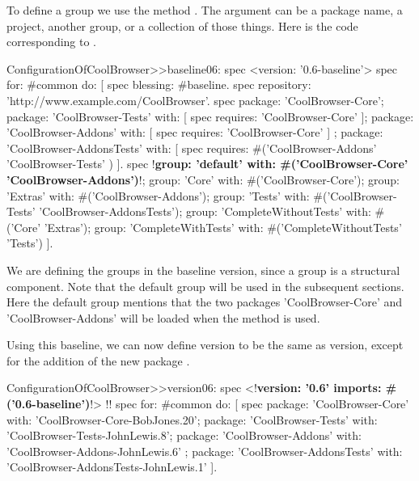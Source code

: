 \documentclass[a4paper,10pt,twoside]{book}
\begin{document}
To define a group we use the method \mbox{.} The  argument can be a package name, a project, another group, or a collection of those things.  Here is the code corresponding to .

 
\begin{code}{}
ConfigurationOfCoolBrowser>>baseline06: spec 
     <version: '0.6-baseline'>
     spec for: #common do: [
          spec blessing: #baseline.
          spec repository: 'http://www.example.com/CoolBrowser'.
          spec 
                 package: 'CoolBrowser-Core';
                 package: 'CoolBrowser-Tests' with: [ spec requires: 'CoolBrowser-Core' ];
                 package: 'CoolBrowser-Addons' with: [ spec requires: 'CoolBrowser-Core' ] ;
                 package: 'CoolBrowser-AddonsTests' with: [ 
                      spec requires: #('CoolBrowser-Addons' 'CoolBrowser-Tests' ) ].
          spec 
                 !\textbf{group: 'default' with: \#('CoolBrowser-Core' 'CoolBrowser-Addons')}!;
                 group: 'Core' with: #('CoolBrowser-Core');
                 group: 'Extras' with: #('CoolBrowser-Addons');
                 group: 'Tests' with: #('CoolBrowser-Tests' 'CoolBrowser-AddonsTests');
                 group: 'CompleteWithoutTests' with: #('Core' 'Extras');
                 group: 'CompleteWithTests' with: #('CompleteWithoutTests' 'Tests')
               ].
\end{code}


 
We are defining the groups in the baseline version, since a group is a structural component. Note that the default group will be used in the subsequent sections. Here the default group mentions that the two packages 'CoolBrowser-Core' and 'CoolBrowser-Addons' will be loaded when the method  is used.

Using this baseline, we can now define version  to be the same as version, except for the addition of the new package .
 
\begin{code}{}
ConfigurationOfCoolBrowser>>version06: spec 
       <!\textbf{version: '0.6' imports: \#('0.6-baseline')}!>
!\vspace{-0.7ex}!
      spec for: #common do: [
            spec 
                  package: 'CoolBrowser-Core' with: 'CoolBrowser-Core-BobJones.20';
                  package: 'CoolBrowser-Tests' with: 'CoolBrowser-Tests-JohnLewis.8';
                  package: 'CoolBrowser-Addons' with: 'CoolBrowser-Addons-JohnLewis.6' ;
                  package: 'CoolBrowser-AddonsTests' with: 'CoolBrowser-AddonsTests-JohnLewis.1' ].
\end{code}
\end{document}
